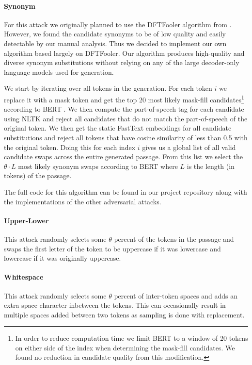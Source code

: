 \documentclass[11pt]{article}
\begin{document}
\paragraph{Synonym} For this attack we originally planned to use the DFTFooler algorithm from \citet{pu-etal-2023-deepfake}. However, we found the candidate synonyms to be of low quality and easily detectable by our manual analysis. Thus we decided to implement our own algorithm based largely on DFTFooler. Our algorithm produces high-quality and diverse synonym substitutions without relying on any of the large decoder-only language models used for generation.

We start by iterating over all tokens in the generation. For each token $i$ we replace it with a mask token and get the top 20 most likely mask-fill candidates\footnote{In order to reduce computation time we limit BERT to a window of 20 tokens on either side of the index when determining the mask-fill candidates. We found no reduction in candidate quality from this modification.} according to BERT \cite{devlin-etal-2019-bert}. We then compute the part-of-speech tag for each candidate using NLTK \cite{bird-loper-2004-nltk} and reject all candidates that do not match the part-of-speech of the original token. We then get the static FastText \cite{bojanowski-etal-2017-enriching} embeddings for all candidate substitutions and reject all tokens that have cosine similarity of less than 0.5 with the original token. Doing this for each index $i$ gives us a global list of all valid candidate swaps across the entire generated passage. From this list we select the $\theta \cdot L$ most likely synonym swaps according to BERT where $L$ is the length (in tokens) of the passage. 

The full code for this algorithm can be found in our project repository along with the implementations of the other adversarial attacks.

\paragraph{Upper-Lower} This attack randomly selects some $\theta$ percent of the tokens in the passage and swaps the first letter of the token to be uppercase if it was lowercase and lowercase if it was originally uppercase.

\paragraph{Whitespace} This attack randomly selects some $\theta$ percent of inter-token spaces and adds an extra space character inbetween the tokens. This can occasionally result in multiple spaces added between two tokens as sampling is done with replacement.
\end{document}
